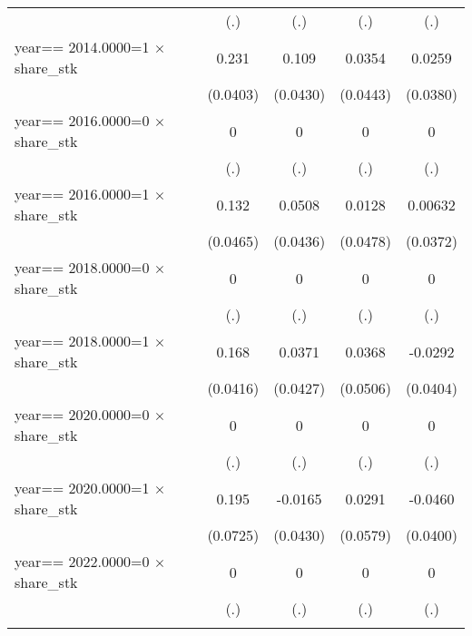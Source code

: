 \begin{table}[htbp]
\begin{tabular}{l*{4}{c}}
                &      (.)         &      (.)         &      (.)         &      (.)         \\
\addlinespace
year==  2014.0000=1 $\times$ share\_stk&    0.231\sym{***}&    0.109\sym{**} &   0.0354         &   0.0259         \\
                & (0.0403)         & (0.0430)         & (0.0443)         & (0.0380)         \\
\addlinespace
year==  2016.0000=0 $\times$ share\_stk&        0         &        0         &        0         &        0         \\
                &      (.)         &      (.)         &      (.)         &      (.)         \\
\addlinespace
year==  2016.0000=1 $\times$ share\_stk&    0.132\sym{***}&   0.0508         &   0.0128         &  0.00632         \\
                & (0.0465)         & (0.0436)         & (0.0478)         & (0.0372)         \\
\addlinespace
year==  2018.0000=0 $\times$ share\_stk&        0         &        0         &        0         &        0         \\
                &      (.)         &      (.)         &      (.)         &      (.)         \\
\addlinespace
year==  2018.0000=1 $\times$ share\_stk&    0.168\sym{***}&   0.0371         &   0.0368         &  -0.0292         \\
                & (0.0416)         & (0.0427)         & (0.0506)         & (0.0404)         \\
\addlinespace
year==  2020.0000=0 $\times$ share\_stk&        0         &        0         &        0         &        0         \\
                &      (.)         &      (.)         &      (.)         &      (.)         \\
\addlinespace
year==  2020.0000=1 $\times$ share\_stk&    0.195\sym{***}&  -0.0165         &   0.0291         &  -0.0460         \\
                & (0.0725)         & (0.0430)         & (0.0579)         & (0.0400)         \\
\addlinespace
year==  2022.0000=0 $\times$ share\_stk&        0         &        0         &        0         &        0         \\
                &      (.)         &      (.)         &      (.)         &      (.)         \\
\addlinespace

\end{tabular}
\end{table}
